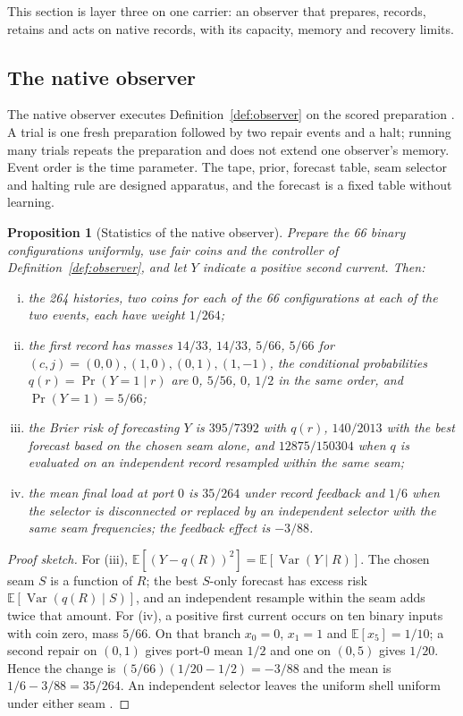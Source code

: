 \documentclass[11pt]{article}
\newtheorem{proposition}[theorem]{Proposition}
\theoremstyle{definition}
\theoremstyle{remark}
\theoremstyle{plain}
\newcommand{\Ex}{\mathbb{E}}
\begin{document}
This section is layer three on one carrier: an observer that prepares,
records, retains and acts on native records, with its capacity, memory and
recovery limits.

\subsection{The native observer}
\label{sec:native-observer}

The native observer executes Definition~\ref{def:observer} on the scored
preparation \cite{oREADME,oDERIV}. A trial is one fresh preparation followed
by two repair events and a halt; running many trials repeats the preparation
and does not extend one observer's memory. Event order is the time
parameter. The tape, prior, forecast table, seam selector and halting rule
are designed apparatus, and the forecast is a fixed table without learning.

\begin{proposition}[Statistics of the native observer]
\label{prop:native-observer}
Prepare the 66 binary configurations uniformly, use fair coins and the
controller of Definition~\ref{def:observer}, and let $Y$ indicate a positive
second current. Then:
\begin{enumerate}[(i)]
\item the 264 histories, two coins for each of the 66 configurations at each
of the two events, each have weight $1/264$;
\item the first record has masses $14/33$, $14/33$, $5/66$, $5/66$ for
$(c,j)=(0,0),(1,0),(0,1),(1,-1)$, the conditional probabilities
$q(r)=\Pr(Y=1\mid r)$ are $0$, $5/56$, $0$, $1/2$ in the same order, and
$\Pr(Y=1)=5/66$;
\item the Brier risk of forecasting $Y$ is $395/7392$ with $q(r)$,
$140/2013$ with the best forecast based on the chosen seam alone, and
$12875/150304$ when $q$ is evaluated on an independent record resampled
within the same seam;
\item the mean final load at port $0$ is $35/264$ under record feedback and
$1/6$ when the selector is disconnected or replaced by an independent
selector with the same seam frequencies; the feedback effect is $-3/88$.
\end{enumerate}
\end{proposition}

\begin{proof}[Proof sketch]
For (iii), $\Ex[(Y-q(R))^2]=\Ex[\operatorname{Var}(Y\mid R)]$. The chosen
seam $S$ is a function of $R$; the best $S$-only forecast has excess risk
$\Ex[\operatorname{Var}(q(R)\mid S)]$, and an independent resample within the
seam adds twice that amount. For (iv), a positive first current occurs on ten
binary inputs with coin zero, mass $5/66$. On that branch $x_0=0$, $x_1=1$
and $\Ex[x_5]=1/10$; a second repair on $(0,1)$ gives port-0 mean $1/2$ and
one on $(0,5)$ gives $1/20$. Hence the change is
$(5/66)(1/20-1/2)=-3/88$ and the mean is $1/6-3/88=35/264$. An independent
selector leaves the uniform shell uniform under either seam
\cite{oDERIV}.
\end{proof}
\end{document}
